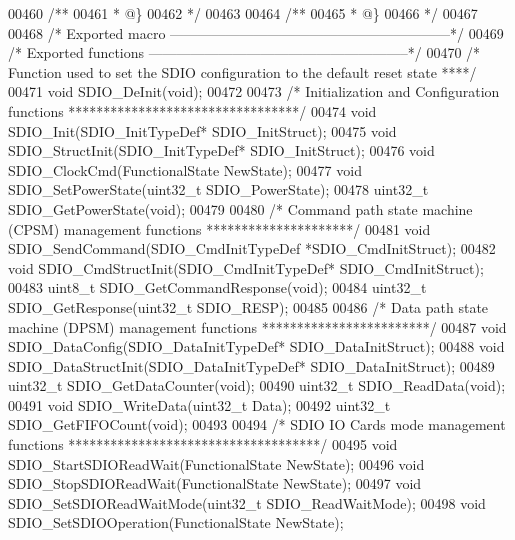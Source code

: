 \begin{DoxyCode}
00460 \textcolor{comment}{/**}
00461 \textcolor{comment}{  * @\}}
00462 \textcolor{comment}{  */}
00463 
00464 \textcolor{comment}{/**}
00465 \textcolor{comment}{  * @\}}
00466 \textcolor{comment}{  */}
00467 
00468 \textcolor{comment}{/* Exported macro ------------------------------------------------------------*/}
00469 \textcolor{comment}{/* Exported functions --------------------------------------------------------*/}
00470 \textcolor{comment}{/*  Function used to set the SDIO configuration to the default reset state ****/}
00471 \textcolor{keywordtype}{void} SDIO_DeInit(\textcolor{keywordtype}{void});
00472 
00473 \textcolor{comment}{/* Initialization and Configuration functions *********************************/}
00474 \textcolor{keywordtype}{void} SDIO_Init(SDIO\_InitTypeDef* SDIO\_InitStruct);
00475 \textcolor{keywordtype}{void} SDIO_StructInit(SDIO\_InitTypeDef* SDIO\_InitStruct);
00476 \textcolor{keywordtype}{void} SDIO_ClockCmd(FunctionalState NewState);
00477 \textcolor{keywordtype}{void} SDIO_SetPowerState(uint32\_t SDIO\_PowerState);
00478 uint32\_t SDIO_GetPowerState(\textcolor{keywordtype}{void});
00479 
00480 \textcolor{comment}{/* Command path state machine (CPSM) management functions *********************/}
00481 \textcolor{keywordtype}{void} SDIO_SendCommand(SDIO\_CmdInitTypeDef *SDIO\_CmdInitStruct);
00482 \textcolor{keywordtype}{void} SDIO_CmdStructInit(SDIO\_CmdInitTypeDef* SDIO\_CmdInitStruct);
00483 uint8\_t SDIO_GetCommandResponse(\textcolor{keywordtype}{void});
00484 uint32\_t SDIO_GetResponse(uint32\_t SDIO\_RESP);
00485 
00486 \textcolor{comment}{/* Data path state machine (DPSM) management functions ************************/}
00487 \textcolor{keywordtype}{void} SDIO_DataConfig(SDIO\_DataInitTypeDef* SDIO\_DataInitStruct);
00488 \textcolor{keywordtype}{void} SDIO_DataStructInit(SDIO\_DataInitTypeDef* SDIO\_DataInitStruct);
00489 uint32\_t SDIO_GetDataCounter(\textcolor{keywordtype}{void});
00490 uint32\_t SDIO_ReadData(\textcolor{keywordtype}{void});
00491 \textcolor{keywordtype}{void} SDIO_WriteData(uint32\_t Data);
00492 uint32\_t SDIO_GetFIFOCount(\textcolor{keywordtype}{void});
00493 
00494 \textcolor{comment}{/* SDIO IO Cards mode management functions ************************************/}
00495 \textcolor{keywordtype}{void} SDIO_StartSDIOReadWait(FunctionalState NewState);
00496 \textcolor{keywordtype}{void} SDIO_StopSDIOReadWait(FunctionalState NewState);
00497 \textcolor{keywordtype}{void} SDIO_SetSDIOReadWaitMode(uint32\_t SDIO\_ReadWaitMode);
00498 \textcolor{keywordtype}{void} SDIO_SetSDIOOperation(FunctionalState NewState);

\end{DoxyCode}
